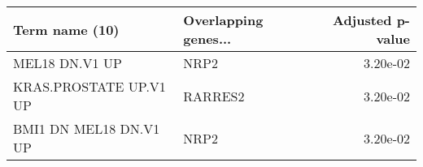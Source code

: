 \begin{tabular}{llr}
\toprule
        Term name (10) & Overlapping genes... &  Adjusted p-value \\
\midrule
        MEL18 DN.V1 UP &                 NRP2 &          3.20e-02 \\
KRAS.PROSTATE UP.V1 UP &              RARRES2 &          3.20e-02 \\
BMI1 DN MEL18 DN.V1 UP &                 NRP2 &          3.20e-02 \\
\bottomrule
\end{tabular}

